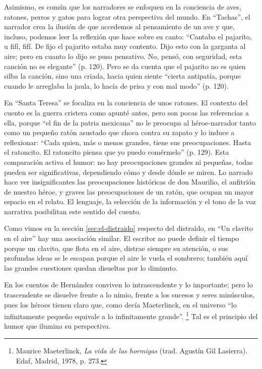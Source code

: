 \documentclass[14pt,twoside,final]{extbook} %
\let\oldfootnote\footnote
\renewcommand\footnote[1]{%
\oldfootnote{\hspace{1mm}#1}}
\begin{document}
Asimismo, es común que los narradores se enfoquen en la conciencia de aves, ratones, perros y gatos para lograr otra perspectiva del mundo. En ``Tachas'', el narrador crea la ilusión de que accedemos al pensamiento de un ave y que, incluso, podemos leer la reflexión que hace sobre su canto: ``Cantaba el pajarito, u fifí, fifí. De fijo el pajarito estaba muy contento. Dijo esto con la garganta al aire; pero en cuanto lo dijo se puso pensativo. No, pensó, con seguridad, esta canción no es elegante'' (p. 120). Pero se da cuenta que el pajarito no es quien silba la canción, sino una criada, hacia quien siente ``cierta antipatía, porque cuando le arreglaba la jaula, lo hacía de prisa y con
mal modo'' (p. 120).

En ``Santa Teresa'' se focaliza en la conciencia de unos ratones. El contexto del cuento es la guerra cristera como apunté antes, pero son pocas las referencias a ella, porque ``el fin de la patria mexicana'' no le preocupa al héroe-narrador tanto como un pequeño ratón asustado que choca contra su zapato y lo induce a reflexionar: ``Cada quien, más o menos grandes, tiene sus preocupaciones. Hasta el ratoncito. El ratoncito piensa que yo puedo comérmelo'' (p. 129). Esta comparación activa el humor: no hay preocupaciones grandes ni pequeñas, todas pueden ser significativas, dependiendo cómo y desde dónde se miren. Lo narrado hace ver insignificantes las preocupaciones históricas de don Maurilio, el anfitrión de nuestro héroe, y graves las preocupaciones de un ratón, que ocupan un mayor espacio en el relato. El lenguaje, la selección de la información y el tono de la voz narrativa posibilitan este
sentido del cuento.

Como vimos en la sección \ref{sec:el-distraido} respecto del distraído, en ``Un clavito en el aire'' hay una asociación similar. El escritor no puede definir el tiempo porque un clavito, que flota en el aire, distrae siempre su atención, o sus profundas ideas se le escapan porque el aire le vuela el sombrero; también aquí las grandes cuestiones quedan disueltas por lo diminuto.

En los cuentos de Hernández conviven lo intrascendente y lo importante; pero lo trascendente se disuelve frente a lo nimio, frente a los sucesos y seres minúsculos, pues los héroes tienen claro que, como decía Maeterlinck, en el universo ``lo infinitamente pequeño equivale a lo infinitamente grande''.\footnote{Maurice Maeterlinck, \emph{La vida de las hormigas} (trad. Agustín Gil Lasierra). Edaf, Madrid, 1978, p. 273.} Tal es el principio del humor que ilumina su perspectiva.
\end{document}
